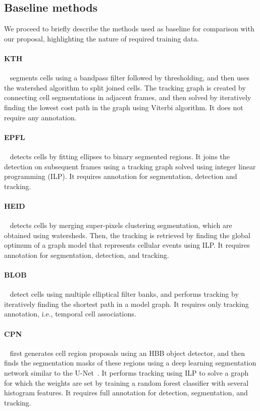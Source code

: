 \documentclass{article}
\begin{document}
\subsection{Baseline methods}

We proceed to briefly describe the methods used as baseline for comparison with our proposal, highlighting the nature of required training data.

\paragraph{KTH}~\cite{kth} segments cells using a bandpass filter followed by thresholding, and then uses the watershed algorithm to split joined cells. The tracking graph is created by connecting cell segmentations in adjacent frames, and then solved by iteratively finding the lowest cost path in the graph using Viterbi algorithm. It does not require any annotation.

\paragraph{EPFL}~\cite{epflheid} detects cells by fitting ellipses to binary segmented regions. It joins the detection on subsequent frames using a tracking graph solved using integer linear programming (ILP). It requires annotation for segmentation, detection and tracking.

\paragraph{HEID}~\cite{epflheid} detects cells by merging super-pixels clustering segmentation, which are obtained using watersheds. Then, the tracking is retrieved by finding the global optimum of a graph model that represents cellular events using ILP. It requires annotation for segmentation, detection, and tracking.

\paragraph{BLOB}~\cite{blob} detect cells using multiple elliptical filter banks, and performs tracking by iteratively finding the shortest path in a model graph. It requires only tracking annotation, i.e., temporal cell associations.

\paragraph{CPN}~\cite{cpn} first generates cell region proposals using an HBB object detector, and then finds the segmentation masks of these regions using a deep learning segmentation network similar to the U-Net~\cite{unet}. It performs tracking using ILP to solve a graph for which the weights are set by training a random forest classifier with several histogram features. It requires full annotation for detection, segmentation, and tracking.
\end{document}
